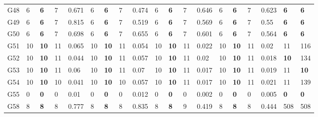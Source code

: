 \documentclass[12pt, a4paper]{article}%
\numberwithin{equation}{section}
\theoremstyle{plain}
\begin{document}
{\begin{landscape}
\begin{longtable}{lllllllllllllllllll}
						G48                                           & 6    & \textbf{6}  & 7   & 0.671 & 6    & \textbf{6}  & 7   & 0.474 & 6    & \textbf{6}  & 7   & 0.646 & 6    & \textbf{6}  & 7   & 0.623 & \textbf{6}                                  & \textbf{6}                               \\
						G49                                           & 6    & \textbf{6}  & 7   & 0.815 & 6    & \textbf{6}  & 7   & 0.519 & 6    & \textbf{6}  & 7   & 0.569 & 6    & \textbf{6}  & 7   & 0.55  & \textbf{6}                                  & \textbf{6}                               \\
						G50                                           & 6    & \textbf{6}  & 7   & 0.698 & 6    & \textbf{6}  & 7   & 0.655 & 6    & \textbf{6}  & 7   & 0.601 & 6    & \textbf{6}  & 7   & 0.564 & \textbf{6}                                  & \textbf{6}                               \\
						G51                                           & 10   & \textbf{10} & 11  & 0.065 & 10   & \textbf{10} & 11  & 0.054 & 10   & \textbf{10} & 11  & 0.022 & 10   & \textbf{10} & 11  & 0.02  & 11                                          & 116                                      \\
						G52                                           & 10   & \textbf{10} & 11  & 0.044 & 10   & \textbf{10} & 11  & 0.057 & 10   & \textbf{10} & 11  & 0.02  & 10   & \textbf{10} & 11  & 0.018 & \textbf{10}                                 & 134                                      \\
						G53                                           & 10   & \textbf{10} & 11  & 0.06  & 10   & \textbf{10} & 11  & 0.07  & 10   & \textbf{10} & 11  & 0.017 & 10   & \textbf{10} & 11  & 0.019 & 11                                          & \textbf{10}                              \\
						G54                                           & 10   & \textbf{10} & 10  & 0.041 & 10   & \textbf{10} & 10  & 0.057 & 10   & \textbf{10} & 11  & 0.017 & 10   & \textbf{10} & 11  & 0.021 & 11                                          & 139                                      \\
						G55                                           & 0    & \textbf{0}  & 0   & 0.01  & 0    & \textbf{0}  & 0   & 0.012 & 0    & \textbf{0}  & 0   & 0.002 & 0    & \textbf{0}  & 0   & 0.005 & \textbf{0}                                  & \textbf{0}                               \\
						G58                                           & 8    & \textbf{8}  & 8   & 0.777 & 8    & \textbf{8}  & 8   & 0.835 & 8    & \textbf{8}  & 9   & 0.419 & 8    & \textbf{8}  & 8   & 0.444 & 508                                         & 508                                      \\

\end{longtable}
\end{landscape}}
\end{document}
